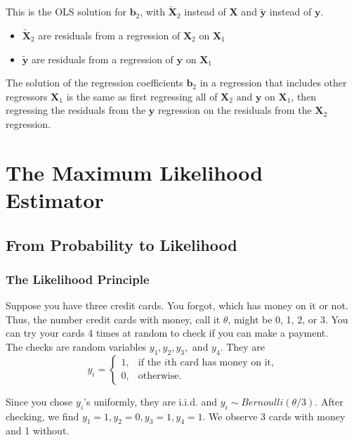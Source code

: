 \documentclass[a4paper,12pt]{article}
\begin{document}
This is the OLS solution for $\bm{b}_2$, with $\bm{\tilde{X}}_2$ instead of $\bm{X}$ and  $\bm{\tilde{y}}$ instead of $\bm{y}$.
\begin{itemize}
	\item $\bm{\tilde{X}}_2$ are residuals from a regression of $\bm{X}_2$ on $\bm{X}_1$
  \item $\bm{\tilde{y}}$ are residuals from a regression of $\bm{y}$ on $\bm{X}_1$
\end{itemize}

The solution of the regression coefficients $\bm{b}_2$ in a regression that includes other regressors $\bm{X}_1$ is the same as first regressing all of $\bm{X}_2$ and $\bm{y}$ on $\bm{X}_1$, then regressing the residuals from the $\bm{y}$ regression on the residuals from the $\bm{X}_2$ regression.

\clearpage




\section{The Maximum Likelihood Estimator}
\label{The Maximum Likelihood Estimator}

\subsection{From Probability to Likelihood}

\subsubsection*{The Likelihood Principle}
Suppose you have three credit cards. You forgot, which has money on it or not. Thus, the number credit cards with money, call it $\theta$, might be 0, 1, 2, or 3. You can try your cards 4 times at random to check if you can make a payment.\\[2ex]
The checks are random variables $y_1, y_2, y_3,$ and $y_4$. They are
$$y_i= \begin{cases}
			      1, & \text{if the $i$th card has money on it,}\\
            0, & \text{otherwise}.
		 \end{cases}$$

Since you chose $y_i$'s uniformly, they are i.i.d. and $y_i\sim Bernoulli(\theta/3)$. After checking, we find $y_1=1,y_2=0,y_3=1,y_4=1$. We observe 3 cards with money and 1 without.\\[2ex]
\end{document}
